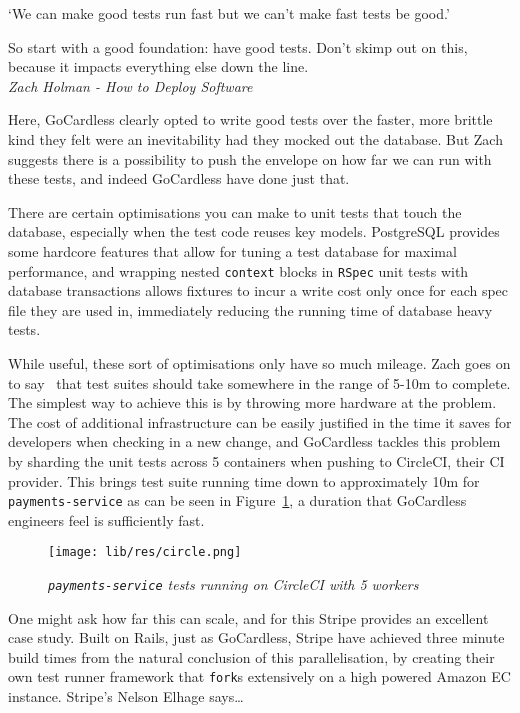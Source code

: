 \documentclass[11pt]{article}
\begin{document}
\begin{displayquote}

  `We can make good tests run fast but we can't make fast tests be good.'

  So start with a good foundation: have good tests. Don't skimp out on this,
  because it impacts everything else down the line. \\

  \textit{Zach Holman - How to Deploy Software~\cite{howToDeploySoftware}}

\end{displayquote}

Here, GoCardless clearly opted to write good tests over the faster, more brittle
kind they felt were an inevitability had they mocked out the database. But Zach
suggests there is a possibility to push the envelope on how far we can run
with these tests, and indeed GoCardless have done just that.

There are certain optimisations you can make to unit tests that touch the
database, especially when the test code reuses key models. PostgreSQL provides
some hardcore features that allow for tuning a test database for maximal
performance, and wrapping nested \texttt{context} blocks in \texttt{RSpec} unit
tests with database transactions allows fixtures to incur a write cost only once
for each spec file they are used in, immediately reducing the running time
of database heavy tests.

While useful, these sort of optimisations only have so much mileage. Zach goes
on to say~\cite{howToDeploySoftware} that test suites should take somewhere in
the range of 5-10m to complete. The simplest way to achieve this is by throwing
more hardware at the problem. The cost of additional infrastructure can be
easily justified in the time it saves for developers when checking in a new
change, and GoCardless tackles this problem by sharding the unit tests across 5
containers when pushing to CircleCI, their CI provider. This brings test suite
running time down to approximately 10m for \texttt{payments-service} as can be
seen in Figure~\ref{fig:circle}, a duration that GoCardless engineers feel is
sufficiently fast.

\begin{figure}
\centering
\texttt{[image: lib/res/circle.png]}
\caption{\label{fig:circle}\textit{\texttt{payments-service} tests running on
CircleCI with 5 workers}}
\end{figure}

One might ask how far this can scale, and for this Stripe provides an excellent
case study. Built on Rails, just as GoCardless, Stripe have achieved three
minute build times from the natural conclusion of this parallelisation, by
creating their own test runner framework that \texttt{fork}s extensively on a
high powered Amazon EC instance. Stripe's Nelson Elhage says\dots
\end{document}
